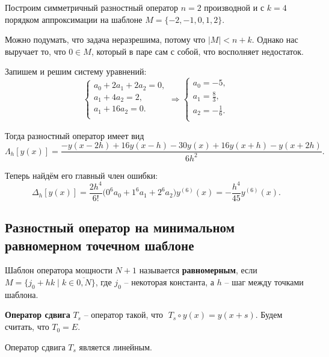 \documentclass[../main.tex]{subfile}
\begin{document}
\begin{example}\label{eq:central_do_example}
	Построим симметричный разностный оператор $n=2$ производной и с $k=4$
	порядком аппроксимации на шаблоне $M=\{-2,-1,0,1,2\}$.

	Можно подумать, что задача неразрешима, потому что $|M|<n+k$. Однако
	нас выручает то, что $0\in M$, который в паре сам с собой, что
	восполняет недостаток.

	Запишем и решим систему уравнений:
	\begin{equation*}
		\begin{cases}
			a_0 + 2a_1 + 2a_2 = 0, \\
			a_1 + 4a_2 = 2, \\
			a_1 + 16a_2 = 0. \\
		\end{cases}
		\Rightarrow
		\begin{cases}
			a_0 = -5, \\
			a_1 = \frac{8}{3}, \\
			a_2 = -\frac{1}{6}.\\
		\end{cases}
	\end{equation*}

	Тогда разностный оператор имеет вид
	\[\Lambda_h[y(x)]=\frac{-y(x-2h)+16y(x-h)-30y(x)+16y(x+h)-y(x+2h)}
	{6h^2}.\]

	Теперь найдём его главный член ошибки:
	\[\Delta_h[y(x)]=\frac{2h^4}{6!}\big(0^6a_0+1^6a_1+2^6a_2\big)y^{(6)}
	(x)=-\frac{h^4}{45}y^{(6)}(x).\]
\end{example}

\subsection{Разностный оператор на минимальном равномерном точечном шаблоне}

\begin{define}
	Шаблон оператора мощности $N+1$ называется \textbf{равномерным}, если \\
	$M=\{j_0+hk\mid k\in\overline{0,N}\}$, где $j_0$ -- некоторая константа,
	а $h$ -- шаг между точками шаблона.
\end{define}

\begin{define}
	\textbf{Оператор сдвига} $T_s$ -- оператор такой, что
	$\; T_s\circ y(x)=y(x+s)$. Будем считать, что $T_0=E$.
\end{define}

\begin{lemma}
	Оператор сдвига $T_s$ является линейным.
\end{lemma}
\end{document}
